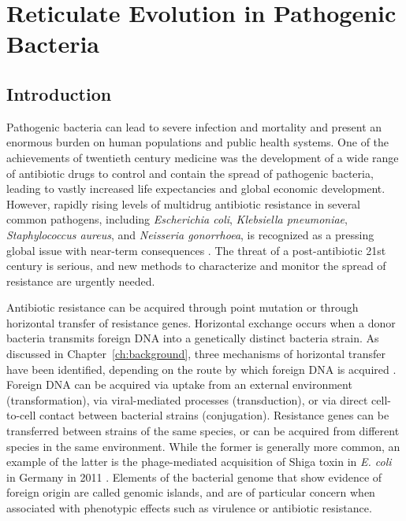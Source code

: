 \chapter{Reticulate Evolution in Pathogenic Bacteria}
\label{ch:pathogens}

\section{Introduction}
\label{pathogens:introduction}

Pathogenic bacteria can lead to severe infection and mortality and present an enormous burden on human populations and public health systems.
One of the achievements of twentieth century medicine was the development of a wide range of antibiotic drugs to control and contain the spread of pathogenic bacteria, leading to vastly increased life expectancies and global economic development.
However, rapidly rising levels of multidrug antibiotic resistance in several common pathogens, including \emph{Escherichia coli}, \emph{Klebsiella pneumoniae}, \emph{Staphylococcus aureus}, and \emph{Neisseria gonorrhoea}, is recognized as a pressing global issue with near-term consequences \cite{Neu:1992gk,Thomas:2005hp,WHO:2014wa}.
The threat of a post-antibiotic 21st century is serious, and new methods to characterize and monitor the spread of resistance are urgently needed.

Antibiotic resistance can be acquired through point mutation or through horizontal transfer of resistance genes.
Horizontal exchange occurs when a donor bacteria transmits foreign DNA into a genetically distinct bacteria strain.
As discussed in Chapter~\ref{ch:background}, three mechanisms of horizontal transfer have been identified, depending on the route by which foreign DNA is acquired \cite{Ochman:2000dr}.
Foreign DNA can be acquired via uptake from an external environment (transformation), via viral-mediated processes (transduction), or via direct cell-to-cell contact between bacterial strains (conjugation).
Resistance genes can be transferred between strains of the same species, or can be acquired from different species in the same environment.
While the former is generally more common, an example of the latter is the phage-mediated acquisition of Shiga toxin in \emph{E. coli} in Germany in 2011 \cite{Rohde:2011ju}.
Elements of the bacterial genome that show evidence of foreign origin are called genomic islands, and are of particular concern when associated with phenotypic effects such as virulence or antibiotic resistance.

